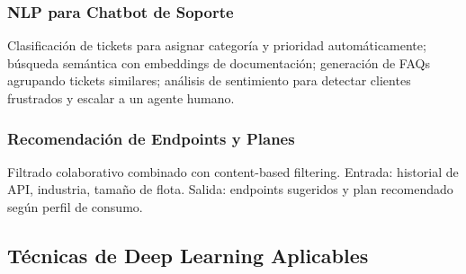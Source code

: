 ﻿\documentclass[11pt, letterpaper]{article}
\begin{document}
\subsubsection{NLP para Chatbot de Soporte}



Clasificación de tickets para asignar categoría y prioridad automáticamente; búsqueda semántica con embeddings de documentación; generación de FAQs agrupando tickets similares; análisis de sentimiento para detectar clientes frustrados y escalar a un agente humano.



\subsubsection{Recomendación de Endpoints y Planes}



Filtrado colaborativo combinado con content-based filtering. Entrada: historial de API, industria, tamaño de flota. Salida: endpoints sugeridos y plan recomendado según perfil de consumo.




\subsection{Técnicas de Deep Learning Aplicables}
\end{document}
